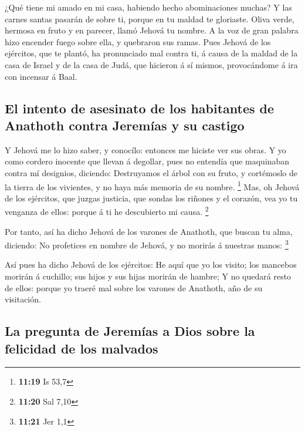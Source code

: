  ¿Qué tiene mi amado en mi casa, habiendo hecho
abominaciones muchas? Y las carnes santas pasarán de sobre ti, porque en
tu maldad te gloriaste.  Oliva verde, hermosa en fruto y en
parecer, llamó Jehová tu nombre. A la voz de gran palabra hizo encender
fuego sobre ella, y quebraron sus ramas.  Pues Jehová de
los ejércitos, que te plantó, ha pronunciado mal contra ti, á causa de
la maldad de la casa de Israel y de la casa de Judá, que hicieron á sí
mismos, provocándome á ira con incensar á Baal.

\hypertarget{el-intento-de-asesinato-de-los-habitantes-de-anathoth-contra-jeremuxedas-y-su-castigo}{%
\subsection{El intento de asesinato de los habitantes de Anathoth contra
Jeremías y su
castigo}\label{el-intento-de-asesinato-de-los-habitantes-de-anathoth-contra-jeremuxedas-y-su-castigo}}

 Y Jehová me lo hizo saber, y conocílo: entonces me hiciste
ver sus obras.  Y yo como cordero inocente que llevan á
degollar, pues no entendía que maquinaban contra mí designios, diciendo:
Destruyamos el árbol con su fruto, y cortémoslo de la tierra de los
vivientes, y no haya más memoria de su nombre. \footnote{\textbf{11:19}
  Is 53,7}  Mas, oh Jehová de los ejércitos, que juzgas
justicia, que sondas los riñones y el corazón, vea yo tu venganza de
ellos: porque á ti he descubierto mi causa. \footnote{\textbf{11:20} Sal
  7,10}

 Por tanto, así ha dicho Jehová de los varones de Anathoth,
que buscan tu alma, diciendo: No profetices en nombre de Jehová, y no
morirás á nuestras manos: \footnote{\textbf{11:21} Jer 1,1}

 Así pues ha dicho Jehová de los ejércitos: He aquí que yo
los visito; los mancebos morirán á cuchillo; sus hijos y sus hijas
morirán de hambre;  Y no quedará resto de ellos: porque yo
traeré mal sobre los varones de Anathoth, año de su visitación.

\hypertarget{la-pregunta-de-jeremuxedas-a-dios-sobre-la-felicidad-de-los-malvados}{%
\subsection{La pregunta de Jeremías a Dios sobre la felicidad de los
malvados}\label{la-pregunta-de-jeremuxedas-a-dios-sobre-la-felicidad-de-los-malvados}}

